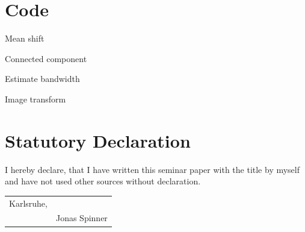 \documentclass{article}
\begin{document}




\appendix
\section{Code}
\begin{code}
	
	\caption[mean\_shift]{Mean shift}
	\label{code:mean_shift}
\end{code}

\begin{code}
	
	\caption[connected\_component]{Connected component}
	\label{code:connected_component}
\end{code}

\begin{code}
	
	\caption[estimate\_bandwidth]{Estimate bandwidth}
	\label{code:estimate_bandwidth}
\end{code}

\begin{code}
	
	\caption[image\_transform]{Image transform}
	\label{code:image_transform}
\end{code}

\newpage
\section*{Statutory Declaration}

I hereby declare, that I have written this seminar paper with the title \textbf{\thetitle} by myself and have not used other sources without declaration.


\begin{tabular}{@{}p{2in}p{2.5in}@{}}
	Karlsruhe, \thedate & \hrulefill \\
	& Jonas Spinner
\end{tabular}
\end{document}
